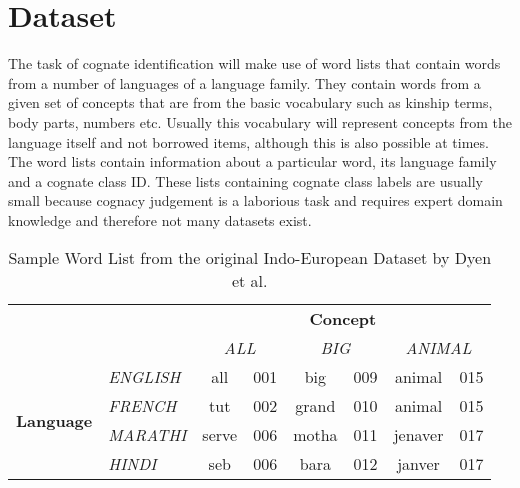 \chapter{Dataset}

The task of cognate identification will make use of word lists that contain words from a number of languages of a language family. They contain words from a given set of concepts that are from the basic vocabulary such as kinship terms, body parts, numbers etc. Usually this vocabulary will represent concepts from the language itself and not borrowed items, although this is also possible at times. The word lists contain information about a particular word, its language family and a cognate class ID. These lists containing cognate class labels are usually small because cognacy judgement is a laborious task and requires expert domain knowledge and therefore not many datasets exist. 

\begin{table}[ht]
\centering
\begin{tabular}{llcccccc}
\multicolumn{1}{c}{\textbf{}}                           & \multicolumn{1}{c}{\textbf{}}         & \multicolumn{6}{c}{\textbf{Concept}}                                                                      \\ \cline{3-8} 
\multicolumn{1}{c}{}                                    & \multicolumn{1}{c}{\textit{}}         & \multicolumn{2}{c}{\textit{ALL}} & \multicolumn{2}{c}{\textit{BIG}} & \multicolumn{2}{c}{\textit{ANIMAL}} \\ \cline{3-8} 
\multicolumn{1}{l|}{\multirow{4}{*}{\textbf{Language}}} & \multicolumn{1}{l|}{\textit{ENGLISH}} & all   & \multicolumn{1}{c|}{001} & big   & \multicolumn{1}{c|}{009} & animal   & \multicolumn{1}{c|}{015} \\ \cline{3-8} 
\multicolumn{1}{l|}{}                                   & \multicolumn{1}{l|}{\textit{FRENCH}}  & tut   & \multicolumn{1}{c|}{002} & grand & \multicolumn{1}{c|}{010} & animal   & \multicolumn{1}{c|}{015} \\ \cline{3-8} 
\multicolumn{1}{l|}{}                                   & \multicolumn{1}{l|}{\textit{MARATHI}} & serve & \multicolumn{1}{c|}{006} & motha & \multicolumn{1}{c|}{011} & jenaver  & \multicolumn{1}{c|}{017} \\ \cline{3-8} 
\multicolumn{1}{l|}{}                                   & \multicolumn{1}{l|}{\textit{HINDI}}   & seb   & \multicolumn{1}{c|}{006} & bara  & \multicolumn{1}{c|}{012} & janver   & \multicolumn{1}{c|}{017} \\ \cline{3-8} 
\end{tabular}
\caption{Sample Word List from the original Indo-European Dataset by Dyen et al.\citep{dyen1992indoeuropean}}
\end{table}

